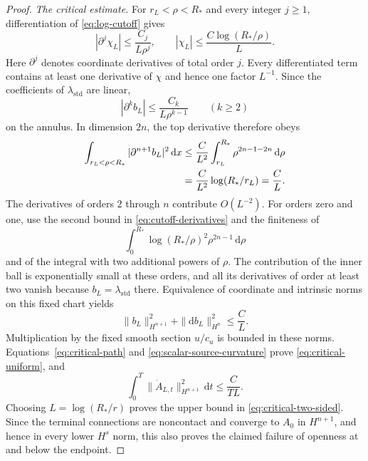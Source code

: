 \documentclass[10pt,a4paper]{amsart}
\newcommand{\dd}{\mathrm d}
\begin{document}
\begin{proof}
\smallskip\noindent
\emph{The critical estimate.}
For $r_L<\rho<R_*$ and every integer $j\geq1$, differentiation of
\eqref{eq:log-cutoff} gives
\begin{equation}\label{eq:cutoff-derivatives}
 |\partial^j\chi_L|\leq\frac{C_j}{L\rho^j},\qquad
 |\chi_L|\leq\frac{C\log(R_*/\rho)}{L}.
\end{equation}
Here $\partial^j$ denotes coordinate derivatives of total order $j$.
Every differentiated term contains at least one derivative of $\chi$ and hence
one factor $L^{-1}$. Since the coefficients of $\lambda_{\mathrm{std}}$ are linear,
\begin{equation}\label{eq:primitive-derivatives}
 |\partial^k b_L|\leq\frac{C_k}{L\rho^{k-1}}
 \qquad(k\geq2)
\end{equation}
on the annulus. In dimension $2n$, the top derivative therefore obeys
\begin{align}
 \int_{r_L<\rho<R_*}|\partial^{n+1}b_L|^2\,\dd x
 &\leq\frac{C}{L^2}
       \int_{r_L}^{R_*}\rho^{2n-1-2n}\,\dd\rho \notag\\
 &=\frac{C}{L^2}\log(R_*/r_L)=\frac{C}{L}.
 \label{eq:critical-top-derivative}
\end{align}
The derivatives of orders $2$ through $n$ contribute $O(L^{-2})$.
For orders zero and one, use the second bound in
\eqref{eq:cutoff-derivatives} and the finiteness of
\[
 \int_0^{R_*}\log(R_*/\rho)^2\rho^{2n-1}\,\dd\rho
\]
and of the integral with two additional powers of $\rho$. The contribution
of the inner ball is exponentially small at these orders, and all its
derivatives of order at least two vanish because $b_L=\lambda_{\mathrm{std}}$ there.
Equivalence of coordinate and intrinsic norms on this fixed chart yields
\begin{equation}\label{eq:critical-b-norm}
 \|b_L\|_{H^{n+1}}^2+\|\dd b_L\|_{H^n}^2\leq\frac{C}{L}.
\end{equation}
Multiplication by the fixed smooth section $u/c_u$ is bounded in these norms.
Equations~\eqref{eq:critical-path} and
\eqref{eq:scalar-source-curvature} prove
\eqref{eq:critical-uniform}, and
\[
 \int_0^T\|\dot A_{L,t}\|_{H^{n+1}}^2\,\dd t
 \leq\frac{C}{TL}.
\]
Choosing $L=\log(R_*/r)$ proves the upper bound in
\eqref{eq:critical-two-sided}. Since the terminal connections are noncontact
and converge to $A_0$ in $H^{n+1}$, and hence in every lower $H^s$ norm,
this also proves the claimed failure of openness at and below the endpoint.


\end{proof}
\end{document}
